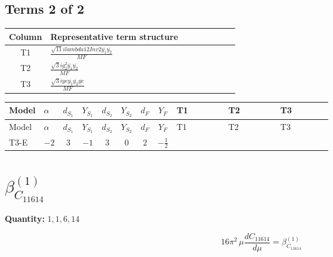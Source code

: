 \documentclass[8pt]{article}
\begin{document}
\begin{landscape}
\subsection*{Terms 2 of 2}
\begin{center}
\begin{tabular}{@{}c >{\raggedright\arraybackslash}p{0.82\linewidth}@{}}
\toprule
Column & Representative term structure \\
\midrule
T1 & \(\displaystyle \frac{\sqrt{11} i lambda12Inv2 \overline{y_{1}} \overline{y_{2}}}{MF}\) \\
\midrule
T2 & \(\displaystyle \frac{\sqrt{3} i g_{2}^{2} \overline{y_{1}} \overline{y_{2}}}{MF}\) \\
\midrule
T3 & \(\displaystyle \frac{\sqrt{3} i ye \overline{y_{1}} \overline{y_{2}} \overline{ye}}{MF}\) \\
\midrule
\bottomrule
\end{tabular}
\end{center}
\smallskip
\tiny
\begin{longtable}{@{}llcccccc >{\raggedright\arraybackslash}p{0.21\linewidth} >{\raggedright\arraybackslash}p{0.21\linewidth} >{\raggedright\arraybackslash}p{0.21\linewidth}@{}}
\toprule
Model & $\alpha$ & $d_{S_1}$ & $Y_{S_1}$ & $d_{S_2}$ & $Y_{S_2}$ & $d_F$ & $Y_F$ & T1 & T2 & T3 \\
\midrule
\endfirsthead
\toprule
Model & $\alpha$ & $d_{S_1}$ & $Y_{S_1}$ & $d_{S_2}$ & $Y_{S_2}$ & $d_F$ & $Y_F$ & T1 & T2 & T3 \\
\midrule
\endhead
T3-E & $-2$ & $3$ & $-1$ & $3$ & $0$ & $2$ & $-\frac{1}{2}$ & \scriptsize\adjustbox{max width=\linewidth}{$\begin{gathered} \frac{3 \sqrt{11} i lambda12Inv2 \overline{y_{1}} \overline{y_{2}}}{22 MF}\end{gathered}$} & \scriptsize\adjustbox{max width=\linewidth}{$\begin{gathered} \frac{11 \sqrt{3} i g_{2}^{2} \overline{y_{1}} \overline{y_{2}}}{8 MF}\end{gathered}$} & \scriptsize\adjustbox{max width=\linewidth}{$\begin{gathered} - \frac{\sqrt{3} i ye \overline{y_{1}} \overline{y_{2}} \overline{ye}}{12 MF}\end{gathered}$} \\
\midrule
\bottomrule
\end{longtable}
\clearpage
\section*{$\beta_{C_{11614}}^{(1)}$}
\noindent\textbf{Quantity: }$\mathrm{1,1,6,14}$\par\smallskip
\[16\pi^2\,\mu\frac{d C_{11614}}{d\mu}=\beta_{C_{11614}}^{(1)}\]

\end{landscape}
\end{document}

